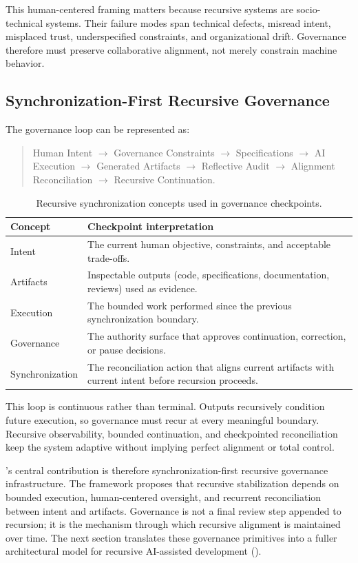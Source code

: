 This human-centered framing matters because recursive systems are socio-technical systems. Their failure modes span technical defects, misread intent, misplaced trust, underspecified constraints, and organizational drift. Governance therefore must preserve collaborative alignment, not merely constrain machine behavior.

\subsection{Synchronization-First Recursive Governance}

The governance loop can be represented as:
\begin{quote}
Human Intent $\rightarrow$ Governance Constraints $\rightarrow$ Specifications $\rightarrow$ AI Execution $\rightarrow$ Generated Artifacts $\rightarrow$ Reflective Audit $\rightarrow$ Alignment Reconciliation $\rightarrow$ Recursive Continuation.
\end{quote}

\begin{table}[H]
  \centering
  \small
  \caption{Recursive synchronization concepts used in governance checkpoints.}
  \label{tab:recursive-synchronization-concepts}
  \begin{tabularx}{\linewidth}{l X}
    \toprule
    \textbf{Concept} & \textbf{Checkpoint interpretation} \\
    \midrule
    Intent & The current human objective, constraints, and acceptable trade-offs. \\
    Artifacts & Inspectable outputs (code, specifications, documentation, reviews) used as evidence. \\
    Execution & The bounded work performed since the previous synchronization boundary. \\
    Governance & The authority surface that approves continuation, correction, or pause decisions. \\
    Synchronization & The reconciliation action that aligns current artifacts with current intent before recursion proceeds. \\
    \bottomrule
  \end{tabularx}
\end{table}

This loop is continuous rather than terminal. Outputs recursively condition future execution, so governance must recur at every meaningful boundary. Recursive observability, bounded continuation, and checkpointed reconciliation keep the system adaptive without implying perfect alignment or total control.

's central contribution is therefore synchronization-first recursive governance infrastructure. The framework proposes that recursive stabilization depends on bounded execution, human-centered oversight, and recurrent reconciliation between intent and artifacts. Governance is not a final review step appended to recursion; it is the mechanism through which recursive alignment is maintained over time. The next section translates these governance primitives into a fuller architectural model for recursive AI-assisted development ().
